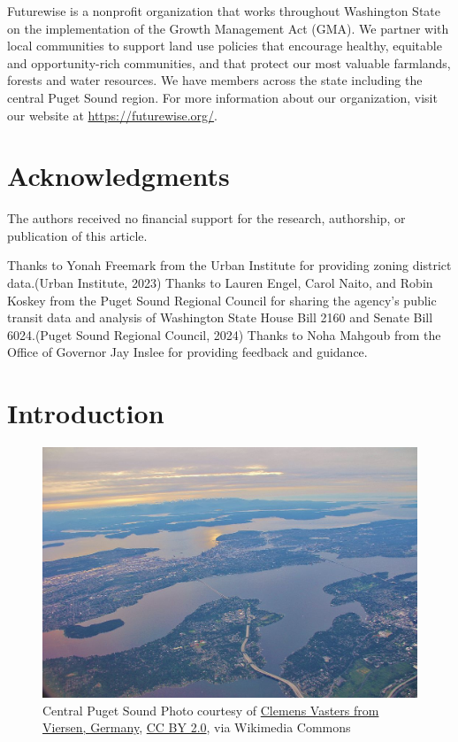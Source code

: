 \documentclass[
]{agujournal2019}
\begin{document}
Futurewise is a nonprofit organization that works throughout Washington
State on the implementation of the Growth Management Act (GMA). We
partner with local communities to support land use policies that
encourage healthy, equitable and opportunity-rich communities, and that
protect our most valuable farmlands, forests and water resources. We
have members across the state including the central Puget Sound region.
For more information about our organization, visit our website at
\url{https://futurewise.org/}.

\section*{Acknowledgments}\label{acknowledgments}

The authors received no financial support for the research, authorship,
or publication of this article.

Thanks to Yonah Freemark from the Urban Institute for providing zoning
district data.(Urban Institute, 2023) Thanks to Lauren Engel, Carol
Naito, and Robin Koskey from the Puget Sound Regional Council for
sharing the agency's public transit data and analysis of Washington
State House Bill 2160 and Senate Bill 6024.(Puget Sound Regional
Council, 2024) Thanks to Noha Mahgoub from the Office of Governor Jay
Inslee for providing feedback and guidance.

\section{Introduction}\label{introduction}

\begin{figure}[H]

{\centering \includegraphics{images/seattle-aerial-wikicommons.jpg}

}

\caption{Central Puget Sound \textbar{} Photo courtesy of
\hyperref[0]{Clemens Vasters from Viersen, Germany}, \hyperref[0]{CC BY
2.0}, via Wikimedia Commons}

\end{figure}%
\end{document}

